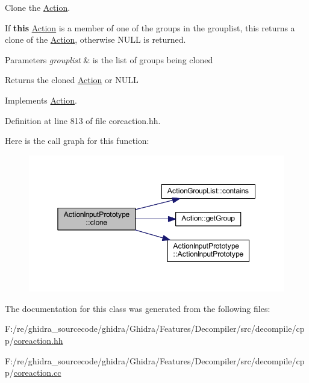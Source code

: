 Clone the \mbox{\hyperlink{class_action}{Action}}. 

If {\bfseries{this}} \mbox{\hyperlink{class_action}{Action}} is a member of one of the groups in the grouplist, this returns a clone of the \mbox{\hyperlink{class_action}{Action}}, otherwise N\+U\+LL is returned. 
\begin{DoxyParams}{Parameters}
{\em grouplist} & is the list of groups being cloned \\
\hline
\end{DoxyParams}
\begin{DoxyReturn}{Returns}
the cloned \mbox{\hyperlink{class_action}{Action}} or N\+U\+LL 
\end{DoxyReturn}


Implements \mbox{\hyperlink{class_action_af8242e41d09e5df52f97df9e65cc626f}{Action}}.



Definition at line 813 of file coreaction.\+hh.

Here is the call graph for this function\+:
\nopagebreak
\begin{figure}[H]
\begin{center}
\leavevmode
\includegraphics[width=350pt]{class_action_input_prototype_a2443b3263f3b443bb7c99261a7f6289e_cgraph}
\end{center}
\end{figure}


The documentation for this class was generated from the following files\+:\begin{DoxyCompactItemize}
\item 
F\+:/re/ghidra\+\_\+sourcecode/ghidra/\+Ghidra/\+Features/\+Decompiler/src/decompile/cpp/\mbox{\hyperlink{coreaction_8hh}{coreaction.\+hh}}\item 
F\+:/re/ghidra\+\_\+sourcecode/ghidra/\+Ghidra/\+Features/\+Decompiler/src/decompile/cpp/\mbox{\hyperlink{coreaction_8cc}{coreaction.\+cc}}\end{DoxyCompactItemize}
